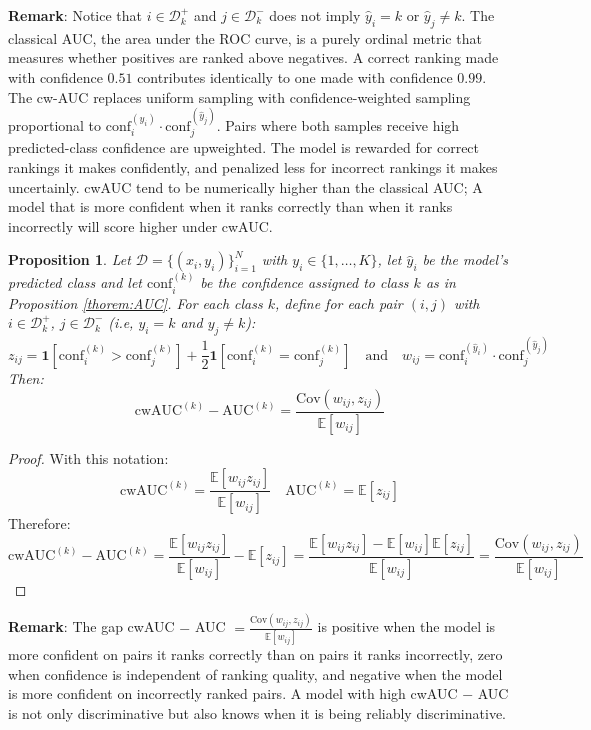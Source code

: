\documentclass{article}
\theoremstyle{plain}
\newtheorem{theorem}{Proposition}
\theoremstyle{definition}
\theoremstyle{remark}
\begin{document}
{\bf{Remark}}:  Notice that $i \in \mathcal{D}^+_k$ and $j \in \mathcal{D}^-_k$ does not imply $\hat{y}_i = k$ or $\hat{y}_j \not= k$.
The classical AUC, the area under the ROC curve, is a purely ordinal metric that  measures whether positives are ranked above negatives. A correct ranking made with confidence $0.51$ contributes identically to one made with confidence $0.99$.
The cw-AUC replaces uniform sampling with confidence-weighted sampling proportional to $\text{conf}_i^{(\hat{y}_i)} \cdot \text{conf}_j^{(\hat{y}_j)}$.
Pairs where both samples receive high predicted-class confidence are upweighted. The model is rewarded for correct rankings it makes confidently, and penalized less for incorrect rankings it makes uncertainly. cwAUC tend to be numerically higher than the classical AUC;  A model that is more confident when it ranks correctly than when it ranks incorrectly will score higher under cwAUC. 
\bigskip

\begin{theorem} \label{thorem:AUC_diffs}
Let $\mathcal{D} = \{(x_i, y_i)\}_{i=1}^N$ with $y_i \in \{1, \ldots, K\}$, let $\hat{y}_i$ be the model's predicted class and let $\text{conf}_i^{(k)}$ be the confidence assigned to class $k$ as in Proposition \ref{thorem:AUC}. For each class $k$, define for each pair $(i,j)$ with $i \in \mathcal{D}^+_k$, $j \in \mathcal{D}^-_k$  (i.e, $y_i = k$ and $y_j \not= k$): \[
z_{ij} =\mathbf{1}[\text{conf}_i^{(k)} > \text{conf}_j^{(k)}] + \frac{1}{2}\mathbf{1}[\text{conf}_i^{(k)} = \text{conf}_j^{(k)}] \quad \text{and} \quad w_{ij} = \text{conf}_i^{(\hat{y}_i)} \cdot \text{conf}_j^{(\hat{y}_j)} 
\]  Then: \[
\text{cwAUC}^{(k)} - \text{AUC}^{(k)} = \frac{\text{Cov}(w_{ij}, z_{ij})}{\mathbb{E}[w_{ij}]}
\]
\end{theorem}
\begin{proof}
With this notation: \[
\text{cwAUC}^{(k)} = \frac{\mathbb{E}[w_{ij} z_{ij}]}{\mathbb{E}[w_{ij}]} \quad \text{AUC}^{(k)} = \mathbb{E}[z_{ij}]
\]
Therefore: \[
\text{cwAUC}^{(k)} - \text{AUC}^{(k)} = \frac{\mathbb{E}[w_{ij} z_{ij}]}{\mathbb{E}[w_{ij}]} - \mathbb{E}[z_{ij}] = \frac{\mathbb{E}[w_{ij} z_{ij}] - \mathbb{E}[w_{ij}]\mathbb{E}[z_{ij}]}{\mathbb{E}[w_{ij}]} = \frac{\text{Cov}(w_{ij}, z_{ij})}{\mathbb{E}[w_{ij}]} \]
\end{proof}
\bigskip


{\bf{Remark}}:   The gap cwAUC $-$ AUC $= \frac{\text{Cov}(w_{ij}, z_{ij})}{\mathbb{E}[w_{ij}]}$ is positive when the model is more confident on pairs it ranks correctly than on pairs it ranks incorrectly, zero when confidence is independent of ranking quality, and negative when the model is more confident on incorrectly ranked pairs. A model with high cwAUC $-$ AUC is not only discriminative but also knows when it is being reliably discriminative. 
\bigskip
\end{document}
